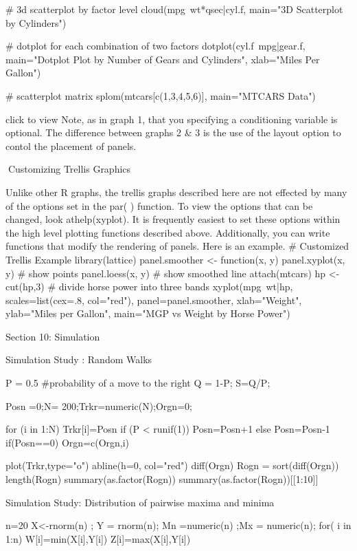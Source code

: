 \begin{frame}
\begin{frame}
# 3d scatterplot by factor level 
cloud(mpg~wt*qsec|cyl.f, 
   main="3D Scatterplot by Cylinders") 

# dotplot for each combination of two factors 
dotplot(cyl.f~mpg|gear.f, 
   main="Dotplot Plot by Number of Gears and Cylinders",
   xlab="Miles Per Gallon")

# scatterplot matrix 
splom(mtcars[c(1,3,4,5,6)], 
   main="MTCARS Data")

 
click to view
Note, as in graph 1, that you specifying a conditioning variable is optional. The difference between graphs 2 & 3 is the use of the layout option to contol the placement of panels.

Customizing Trellis Graphics


Unlike other R graphs, the trellis graphs described here are not effected by many of the options set in the par( ) function. To view the options that can be changed, look athelp(xyplot). It is frequently easiest to set these options within the high level plotting functions described above. Additionally, you can write functions that modify the rendering of panels. Here is an example.
# Customized Trellis Example
library(lattice)
panel.smoother <- function(x, y) {
  panel.xyplot(x, y) # show points 
  panel.loess(x, y)  # show smoothed line 
}
attach(mtcars)
hp <- cut(hp,3) # divide horse power into three bands 
xyplot(mpg~wt|hp, scales=list(cex=.8, col="red"),
   panel=panel.smoother,
   xlab="Weight", ylab="Miles per Gallon", 
   main="MGP vs Weight by Horse Power")




Section 10: Simulation

Simulation Study : Random Walks



P = 0.5 					#probability of a move to the right
Q = 1-P; S=Q/P;

Posn =0;N= 200;Trkr=numeric(N);Orgn=0; 

for (i in 1:N)
	{
	Trkr[i]=Posn
	if (P < runif(1)) Posn=Posn+1 else Posn=Posn-1
	if(Posn==0) Orgn=c(Orgn,i)
	}


plot(Trkr,type="o")
abline(h=0, col="red")
diff(Orgn)
Rogn = sort(diff(Orgn))
length(Rogn)
summary(as.factor(Rogn))
summary(as.factor(Rogn))[[1:10]]

Simulation Study: Distribution of pairwise maxima and minima



n=20
X<-rnorm(n) ; Y = rnorm(n); 
Mn =numeric(n) ;Mx = numeric(n);
for( i in 1:n)
{
W[i]=min(X[i],Y[i])
Z[i]=max(X[i],Y[i])
}


\end{frame}
\end{frame}
